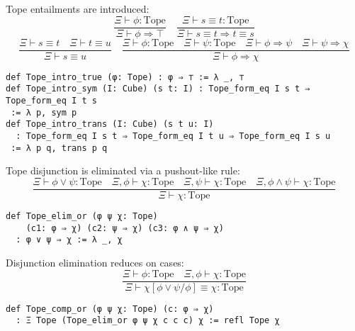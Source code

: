 \documentclass{article}
\begin{document}
\begin{definition}
Tope entailments are introduced:
\[
\frac{\Xi \vdash \phi : \text{Tope}}{\Xi \vdash \phi \Rightarrow \top} \quad \frac{\Xi \vdash s \equiv t : \text{Tope}}{\Xi \vdash s \equiv t \Rightarrow t \equiv s}
\]
\[
\frac{\Xi \vdash s \equiv t \quad \Xi \vdash t \equiv u}{\Xi \vdash s \equiv u} \quad \frac{\Xi \vdash \phi : \text{Tope} \quad \Xi \vdash \psi : \text{Tope} \quad \Xi \vdash \phi \Rightarrow \psi \quad \Xi \vdash \psi \Rightarrow \chi}{\Xi \vdash \phi \Rightarrow \chi}
\]
\begin{lstlisting}[mathescape=true]
def Tope_intro_true (φ: Tope) : φ ⇒ ⊤ := λ _, ⊤
def Tope_intro_sym (I: Cube) (s t: I) : Tope_form_eq I s t ⇒ Tope_form_eq I t s
 := λ p, sym p
def Tope_intro_trans (I: Cube) (s t u: I)
  : Tope_form_eq I s t ⇒ Tope_form_eq I t u ⇒ Tope_form_eq I s u
 := λ p q, trans p q
\end{lstlisting}
\end{definition}

\begin{definition}
Tope disjunction is eliminated via a pushout-like rule:
\[
\frac{\Xi \vdash \phi \vee \psi : \text{Tope} \quad \Xi, \phi \vdash \chi : \text{Tope} \quad \Xi, \psi \vdash \chi : \text{Tope} \quad \Xi, \phi \wedge \psi \vdash \chi : \text{Tope}}{\Xi \vdash \chi : \text{Tope}}
\]
\begin{lstlisting}[mathescape=true]
def Tope_elim_or (φ ψ χ: Tope)
    (c1: φ ⇒ χ) (c2: ψ ⇒ χ) (c3: φ ∧ ψ ⇒ χ)
  : φ ∨ ψ ⇒ χ := λ _, χ
\end{lstlisting}
\end{definition}

\begin{theorem}
Disjunction elimination reduces on cases:
\[
\frac{\Xi \vdash \phi : \text{Tope} \quad \Xi, \phi \vdash \chi : \text{Tope}}{\Xi \vdash \chi[\phi \vee \psi / \phi] \equiv \chi : \text{Tope}}
\]
\begin{lstlisting}[mathescape=true]
def Tope_comp_or (φ ψ χ: Tope) (c: φ ⇒ χ)
  : Ξ Tope (Tope_elim_or φ ψ χ c c c) χ := refl Tope χ
\end{lstlisting}
\end{theorem}
\end{document}
